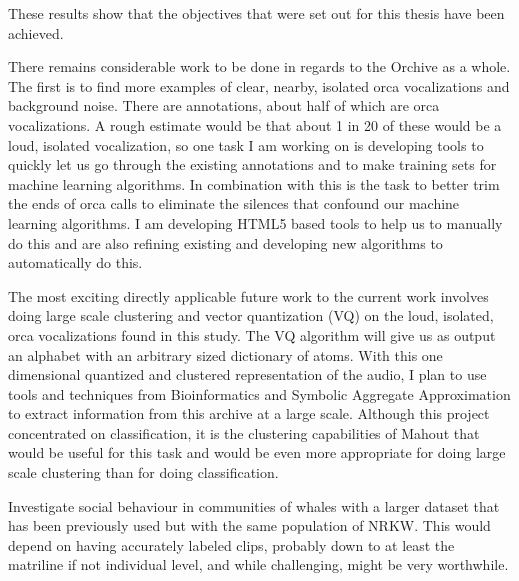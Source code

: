 \documentclass[12pt,oneside]{book}
\begin{document}
These results show that the objectives that were set out for this
thesis have been achieved.



\label{chap:future}

There remains considerable work to be done in regards to the Orchive
as a whole.  The first is to find more examples of clear, nearby,
isolated orca vocalizations and background noise.  There are
\totalAnnotations annotations, about half of which are orca
vocalizations.  A rough estimate would be that about 1 in 20 of these
would be a loud, isolated vocalization, so one task I am working on
is developing tools to quickly let us go through the existing
annotations and to make training sets for machine learning algorithms.
In combination with this is the task to better trim the ends of orca
calls to eliminate the silences that confound our machine learning
algorithms.  I am developing HTML5 based tools to help us to
manually do this and are also refining existing and developing new
algorithms to automatically do this.

The most exciting directly applicable future work to the current work
involves doing large scale clustering and vector quantization (VQ) on
the loud, isolated, orca vocalizations found in this study.  The VQ
algorithm will give us as output an alphabet with an arbitrary sized
dictionary of atoms.  With this one dimensional quantized and
clustered representation of the audio, I plan to use tools and
techniques from Bioinformatics \cite{sarkar2002discovering} and
Symbolic Aggregate Approximation \cite{lin07sax} to extract
information from this archive at a large scale.  Although this project
concentrated on classification, it is the clustering capabilities of
Mahout that would be useful for this task and would be even more
appropriate for doing large scale clustering than for doing
classification.

Investigate social behaviour in communities of whales
\cite{weiss2007intra} with a larger dataset that has been previously
used \cite{janik2000social} but with the same population of NRKW.
This would depend on having accurately labeled clips, probably down to
at least the matriline if not individual level, and while challenging,
might be very worthwhile.
\end{document}
